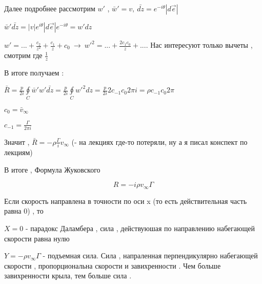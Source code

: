 Далее подробнее рассмотрим $w'$ , $\bar{w}' = v, \ \bar{d z} = e^{-i \theta} |d \overrightarrow{e} |$

$\bar{w}' \bar{dz} = |v| e^{i \theta} |d \overrightarrow{e} | e^{-i \theta} = w' dz$

$w' = ... + \frac{c_2}{z^2} + \frac{c_1}{z} + c_0 \ \rightarrow \ w'^2 = ... + \frac{2 c_1 c_0}{z} + ...$. Нас интересуют только вычеты , смотрим где $\frac{1}{z}$

В итоге получаем :

$\bar{R} =  \frac{p}{2 i} \oint \limits_{C} \bar{w}'  w'  \bar{d z} =  \frac{p}{2 i} \oint \limits_{C} w'^2 dz =   \frac{p}{2 i} 2 c_{-1} c_0 2 \pi i = \rho c_{-1} c_0 2 \pi$

$ c_0 = \bar{v}_{\infty}$

$c_{-1} = \frac{\Gamma}{2 \pi i} $

Значит , $\bar{R} = - \rho \frac{\Gamma}{i} v_{\infty} $ (- на лекциях где-то потеряли, ну а я писал конспект по лекциям)

В итоге , Формула Жуковского

$$
  R = -i \rho v_{\infty} \Gamma
$$

Если скорость направлена в точности по оси x (то есть действительная часть равна 0) , то

$X = 0$ - парадокс Даламбера , сила , действуюшая по направлению набегающей скорости равна нулю

$Y = -\rho v_{\infty} \Gamma $ - подъемная сила. Сила , напраленная перпендикулярно набегающей скорости , пропорциональна скорости и завихренности . Чем больше завихренности крыла, тем больше сила .
